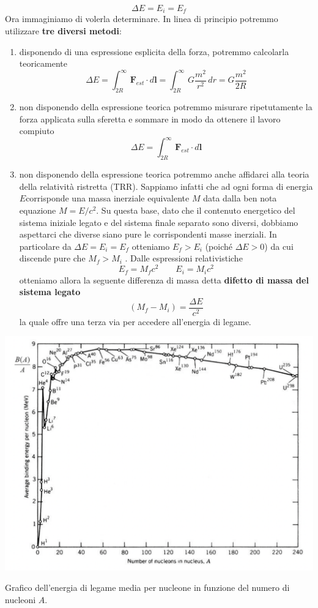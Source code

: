\begin{equation}
	\Delta E = E_{i} = E_{f}
\end{equation}
Ora immaginiamo di volerla determinare.
In linea di principio potremmo utilizzare \textbf{tre diversi metodi}:
\begin{enumerate}
	\def\labelenumi{\arabic{enumi}.}
	\tightlist
	\item
	disponendo di una espressione esplicita della forza, potremmo
	calcolarla teoricamente \[
								\Delta E = \int_{2 R}^{\infty} \bm{F}_{est} \cdot d\bm{l} = \int_{2 R}^{\infty} G \frac{m^{2}}{r^{2}} \, dr
								= G \frac{m^{2}}{2R}
	\]
	\item
	non disponendo della espressione teorica potremmo misurare
	ripetutamente la forza applicata sulla sferetta e sommare in modo da
	ottenere il lavoro compiuto \[
									\Delta E = \int _{2R}^{\infty} \bm{F}_{est} \cdot d\bm{l}
	\]
	\item
	non disponendo della espressione teorica potremmo anche affidarci alla
	teoria della relatività ristretta (TRR). Sappiamo infatti che ad ogni
	forma di energia \(E\)corrisponde una massa inerziale equivalente
	\(M\) data dalla ben nota equazione \(M=E/c^{2}\). Su questa base,
	dato che il contenuto energetico del sistema iniziale legato e del
	sistema finale separato sono diversi, dobbiamo aspettarci che diverse
	siano pure le corrispondenti masse inerziali. In particolare da
	\(\Delta E = E_{i} = E_{f}\) otteniamo \(E_{f} > E_{i}\) (poiché
	\(\Delta E >0\)) da cui discende pure che \(M_{f} > M_{i}\) . Dalle
	espressioni relativistiche \[
								   E_{f} = M_{f}c^{2} \qquad E_{i} = M_{i}c^{2}
	\]otteniamo allora la seguente differenza di massa detta
	\textbf{difetto di massa del sistema legato} \[
													 (M_{f}-M_{i}) = \frac{\Delta E}{c^{2}}
	\] la quale offre una terza via per accedere all'energia di legame.
\end{enumerate}

\begin{marginfigure}
	\includegraphics[width = 1.3 \textwidth,scale = 1]{figs/en-legame-graph}
	\caption{Grafico dell'energia di legame media per nucleone in funzione del numero di nucleoni $A$.}
	\label{fig:en-legame-graph}
\end{marginfigure}

